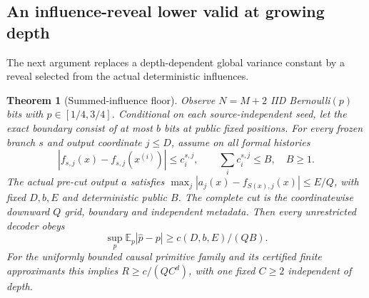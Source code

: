 \documentclass[11pt,letterpaper]{article}
\newtheorem{theorem}{Theorem}[section]
\theoremstyle{definition}\newtheorem{definition}[theorem]{Definition}
\theoremstyle{remark}\newtheorem{remark}[theorem]{Remark}
\newcommand{\E}{\mathbb{E}}
\begin{document}
\subsection{An influence-reveal lower valid at growing depth}
The next argument replaces a depth-dependent global variance constant by a reveal selected from the actual deterministic influences.
\begin{theorem}[Summed-influence floor]\label{thm:iiddepth}
Observe $N=M+2$ IID Bernoulli$(p)$ bits with $p\in[1/4,3/4]$. Conditional on each source-independent seed, let the exact boundary consist of at most $b$ bits at public fixed positions. For every frozen branch $s$ and output coordinate $j\le D$, assume on all formal histories
\[
 |f_{s,j}(x)-f_{s,j}(x^{(i)})|\le c_i^{s,j},\qquad
 \sum_i c_i^{s,j}\le B,\quad B\ge1.
\]
The actual pre-cut output $a$ satisfies
$\max_j|a_j(x)-f_{S(x),j}(x)|\le E/Q$, with fixed $D,b,E$ and deterministic public $B$. The complete cut is the coordinatewise downward $Q$ grid, boundary and independent metadata. Then every unrestricted decoder obeys
\[
 \sup_p\E_p|\widehat p-p|\ge c(D,b,E)/(QB).
\]
For the uniformly bounded causal primitive family and its certified finite approximants this implies $R\ge c/(QC^d)$, with one fixed $C\ge2$ independent of depth.
\end{theorem}
\end{document}
